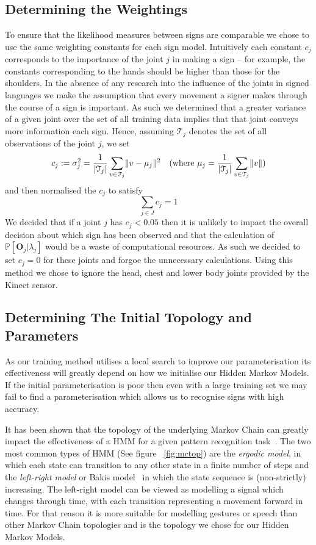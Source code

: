 \subsection{Determining the Weightings}
To ensure that the likelihood measures between signs are comparable we chose to use the same weighting constants for each sign model. Intuitively each constant $c_j$ corresponds to the importance of the joint $j$ in making a sign -- for example, the constants corresponding to the hands should be higher than those for the shoulders. In the absence of any research into the influence of the joints in signed languages we make the assumption that every movement a signer makes through the course of a sign is important. As such we determined that a greater variance of a given joint over the set of all training data implies that that joint conveys more information each sign. Hence, assuming $\mathcal{T}_j$ denotes the set of all observations of the joint $j$, we set
\begin{align*}
c_j := \sigma^2_j &= \frac{1}{\lvert\mathcal{T}_j\rvert}\sum_{v \in \mathcal{T}_j} \lVert v - \mu_j\rVert^2 &(\text{where } \mu_j = \frac{1}{\lvert\mathcal{T}_j\rvert}\sum_{v \in\mathcal{T}_j}\lVert v\rVert)
\end{align*}
and then normalised the $c_j$ to satisfy
\begin{equation*}
\sum_{j \in J} c_j = 1
\end{equation*}
We decided that if a joint $j$ has $c_j < 0.05$ then it is unlikely  to impact the overall decision about which sign has been observed and that the calculation of $\mathbb{P}[\mathbf{O}_j | \lambda_j]$ would be a waste of computational resources. As such we decided to set $c_j = 0$ for these joints and forgoe the unnecessary calculations. Using this method we chose to ignore the head, chest and lower body joints provided by the Kinect sensor.

\subsection{Determining The Initial Topology and Parameters}
As our training method utilises a local search to improve our parameterisation its effectiveness will greatly depend on how we initialise our Hidden Markov Models. If the initial parameterisation is poor then even with a large training set we may fail to find a parameterisation which allows us to recognise signs with high accuracy.

It has been shown that the topology of the underlying Markov Chain can greatly impact the effectiveness of a HMM for a given pattern recognition task~\citep{rabiner1989tutorial, jelinek1998statistical}. The two most common types of HMM (See figure ~\ref{fig:mctop}) are the \emph{ergodic model}, in which each state can transition to any other state in a finite number of steps and the \emph{left-right model} or Bakis model~\citep{bakis1976continuous} in which the state sequence is (non-strictly) increasing. The left-right model can be viewed as modelling a signal which changes through time, with each transition representing a movement forward in time. For that reason it is more suitable for modelling gestures or speech than other Markov Chain topologies and is the topology we chose for our Hidden Markov Models.

